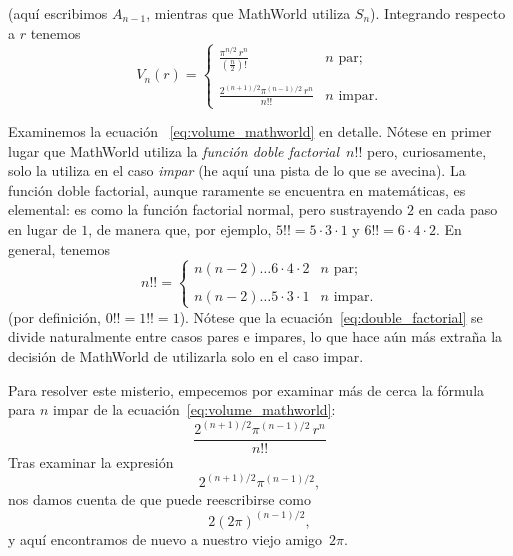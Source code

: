 (aquí escribimos $A_{n-1}$, mientras que MathWorld utiliza $S_n$). Integrando respecto a $r$ tenemos
\begin{equation}
\label{eq:volume_mathworld}
V_n(r) = \begin{cases}
\displaystyle \frac{\pi^{n/2}\,r^n}{(\frac{n}{2})!} & n \text{ par}; \\ \\
\displaystyle \frac{2^{(n+1)/2}\pi^{(n-1)/2}\,r^n}{n!!} & n \text{ impar}.
\end{cases}
\end{equation}

Examinemos la ecuación ~\eqref{eq:volume_mathworld} en detalle. Nótese en primer lugar que MathWorld utiliza la \emph{función doble factorial}~$n!!$ pero, curiosamente, solo la utiliza en el caso \emph{impar} (he aquí una pista de lo que se avecina). La función doble factorial, aunque raramente se encuentra en matemáticas, es elemental: es como la función factorial normal, pero sustrayendo $2$ en cada paso en lugar de $1$, de manera que, por ejemplo, $5!! = 5 \cdot 3 \cdot 1$ y $6!! = 6 \cdot 4 \cdot 2$. En general, tenemos
\begin{equation}
\label{eq:double_factorial}
n!! = \begin{cases}
n(n-2)\ldots6\cdot4\cdot2 & n \text{ par}; \\ \\
n(n-2)\ldots5\cdot3\cdot1 & n \text{ impar}.
\end{cases}
\end{equation}
(por definición, $0!! = 1!! = 1$). Nótese que la ecuación~\eqref{eq:double_factorial} se divide naturalmente entre casos pares e impares, lo que hace aún más extraña la decisión de MathWorld de utilizarla solo en el caso impar.

Para resolver este misterio, empecemos por examinar más de cerca la fórmula para $n$ impar de la ecuación~\eqref{eq:volume_mathworld}:
\[ \frac{2^{(n+1)/2}\pi^{(n-1)/2}\,r^n}{n!!} \]
Tras examinar la expresión
\[ 2^{(n+1)/2}\pi^{(n-1)/2}, \]
nos damos cuenta de que puede reescribirse como
\[ 2(2\pi)^{(n-1)/2}, \]
y aquí encontramos de nuevo a nuestro viejo amigo~$2\pi$.

